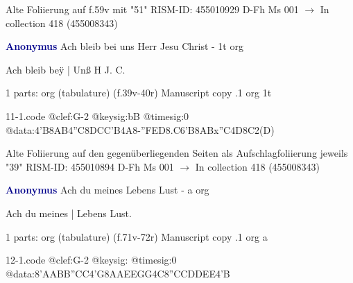 \documentclass[twocolumn]{book}
\begin{document}
\newline Alte Foliierung auf f.59v mit "51"
\newline RISM-ID: 455010929
\newline D-Fh  Ms 001
\newline $\rightarrow$ In collection 418 (455008343)
      
\newline \par \vspace{7pt} \textcolor{darkblue}{\textbf{Anonymus  }}
\newline Ach bleib bei uns Herr Jesu Christ - 1t
\newline org
\newline \begin{itshape}[f.39v, at left:] Ach bleib beÿ | Unß H J. C.\end{itshape} 
\newline \textcolor{darkblue}{}  1 parts: org (tabulature)  (f.39v-40r)
\newline Manuscript copy
.1  org  1t  
\begin{filecontents*}{11-1.code}
@clef:G-2
@keysig:bB
@timesig:0
@data:4'B{8AB}4''C{8DC}{C'B}4A8-{''FED}{8.C6'B8AB}x''C4D8C2(D)
\end{filecontents*}
\newline
%

\newline Alte Foliierung auf den gegenüberliegenden Seiten als Aufschlagfoliierung jeweils "39"
\newline RISM-ID: 455010894
\newline D-Fh  Ms 001
\newline $\rightarrow$ In collection 418 (455008343)
      
\newline \par \vspace{7pt} \textcolor{darkblue}{\textbf{Anonymus  }}
\newline Ach du meines Lebens Lust - a
\newline org
\newline \begin{itshape}[f.78v, at left:] Ach du meines | Lebens Lust.\end{itshape} 
\newline \textcolor{darkblue}{}  1 parts: org (tabulature)  (f.71v-72r)
\newline Manuscript copy
.1  org  a  
\begin{filecontents*}{12-1.code}
@clef:G-2
@keysig:
@timesig:0
@data:{8'AABB}{''CC}4'G{8AAEE}{GG}4C{8''CCDD}{EE}4'B
\end{filecontents*}
\newline
%
\end{document}
